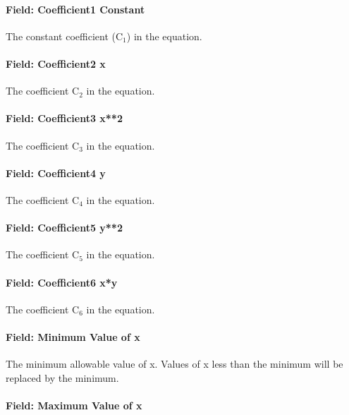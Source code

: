 \paragraph{Field: Coefficient1 Constant}\label{field-coefficient1-constant-7}

The constant coefficient (C\(_{1}\)) in the equation.

\paragraph{Field: Coefficient2 x}\label{field-coefficient2-x-5}

The coefficient C\(_{2}\) in the equation.

\paragraph{Field: Coefficient3 x**2}\label{field-coefficient3-x2-4}

The coefficient C\(_{3}\) in the equation.

\paragraph{Field: Coefficient4 y}\label{field-coefficient4-y-2}

The coefficient C\(_{4}\) in the equation.

\paragraph{Field: Coefficient5 y**2}\label{field-coefficient5-y2-1}

The coefficient C\(_{5}\) in the equation.

\paragraph{Field: Coefficient6 x*y}\label{field-coefficient6-xy-1}

The coefficient C\(_{6}\) in the equation.

\paragraph{Field: Minimum Value of x}\label{field-minimum-value-of-x-7}

The minimum allowable value of x. Values of x less than the minimum will be replaced by the minimum.

\paragraph{Field: Maximum Value of x}\label{field-maximum-value-of-x-8}


